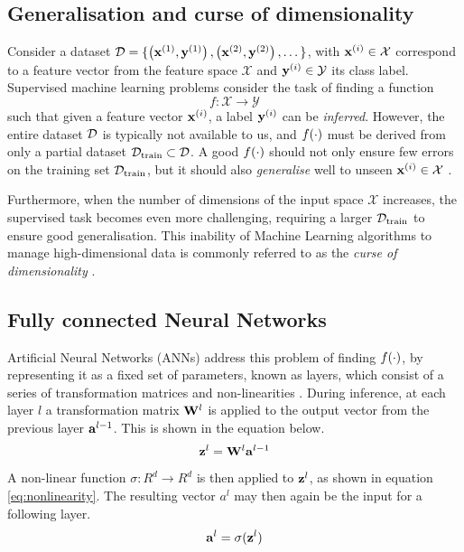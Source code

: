 \subsection{Generalisation and curse of dimensionality}
	Consider a dataset $\mathcal{D} = \{ \left( \mathbf{x}^{(1)}, \mathbf{y}^{(1)} \right), \left( \mathbf{x}^{(2)}, \mathbf{y}^{(2)} \right), \dots \}$, with $\mathbf{x}^{(i)} \in \mathcal{X}$ correspond to a feature vector from the feature space $\mathcal{X}$ and $\mathbf{y}^{(i)} \in \mathcal{Y}$ its class label. Supervised machine learning problems consider the task of finding a function
	$$f: \mathcal{X} \rightarrow \mathcal{Y} \label{eq:fxy} $$
	such that given a feature vector $\mathbf{x}^{(i)}$, a label $\mathbf{y}^{(i)}$ can be \textit{inferred}. However, the entire dataset $\mathcal{D}$ is typically not available to us, and $f(\cdot)$ must be derived from only a partial dataset $\mathcal{D}_{\text{train}} \subset \mathcal{D}$. A good $f(\cdot)$ should not only ensure few errors on the training set $\mathcal{D}_{\text{train}}$, but it should also \textit{generalise} well to unseen $\mathbf{x}^{(i)} \in \mathcal{X}$ \cite{neyshaburExploringGeneralizationDeep2017, chungUnknownExamplesMachine2019, barbieroModelingGeneralizationMachine2020}.

	Furthermore, when the number of dimensions of the input space $\mathcal{X}$ increases, the supervised task becomes even more challenging, requiring a larger $\mathcal{D}_{\text{train}}$ to ensure good generalisation. This inability of Machine Learning algorithms to manage high-dimensional data is commonly referred to as the \textit{curse of dimensionality} \cite{rustUsingRandomizationBreak1997, aremuMachineLearningApproach2020, stuartrussellArtificialIntelligenceModern2022}.
	
\subsection{Fully connected Neural Networks}
		Artificial Neural Networks (ANNs) address this problem of finding $f(\cdot)$, by representing it as a fixed set of parameters, known as layers, which consist of a series of transformation matrices and non-linearities \cite{jainArtificialNeuralNetworks1996, kroghWhatAreArtificial2008, zhangArtificialNeuralNetwork2018}. During inference, at each layer $l$ a transformation matrix $\mathbf{W}^l$ is applied to the output vector from the previous layer $\mathbf{a}^{l-1}$. This is shown in the equation below.
		$$ \mathbf{z}^l = \mathbf{W}^l \mathbf{a}^{l-1} $$
		A non-linear function $\sigma: R^d \rightarrow R^d$ is then applied to $\mathbf{z}^{l}$, as shown in equation \ref{eq:nonlinearity}. The resulting vector $a^l$ may then again be the input for a following layer.
		$$
			\mathbf{a}^l = \sigma(\mathbf{z}^{l})	\label{eq:nonlinearity}
		$$
		
